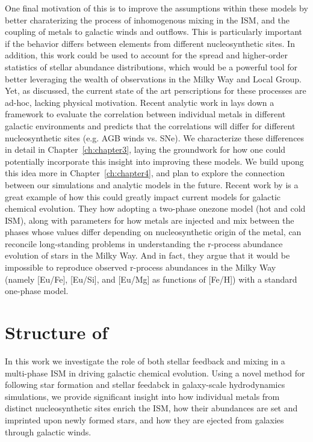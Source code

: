 One final motivation of this \dissertation is to improve the assumptions within these models by better charaterizing the process of inhomogenous mixing in the ISM, and the coupling of metals to galactic winds and outflows. This is particularly important if the behavior differs between elements from different nucleosynthetic sites. In addition, this work could be used to account for the spread and higher-order statistics of stellar abundance distributions, which would be a powerful tool for better leveraging the wealth of observations in the Milky Way and Local Group. Yet, as discussed, the current state of the art perscriptions for these processes are ad-hoc, lacking physical motivation. Recent analytic work in \cite{KrumholzTing2018} lays down a framework to evaluate the correlation between individual metals in different galactic environments and predicts that the correlations will differ for different nucleosynthetic sites (e.g. AGB winds vs. SNe). We characterize these differences in detail in Chapter~\ref{ch:chapter3}, laying the groundwork for how one could potentially incorporate this insight into improving these models. We build upong this idea more in Chapter~\ref{ch:chapter4}, and plan to explore the connection between our simulations and analytic models in the future. Recent work by \cite{SchonrichWeinberg2019} is a great example of how this could greatly impact current models for galactic chemical evolution. They how adopting a two-phase onezone model (hot and cold ISM), along with parameters for how metals are injected and mix between the phases whose values differ depending on nucleosynthetic origin of the metal, can reconcile long-standing problems in understanding the r-process abundance evolution of stars in the Milky Way. And in fact, they argue that it would be impossible to reproduce observed r-process abundances in the Milky Way (namely [Eu/Fe], [Eu/Si], and [Eu/Mg] as functions of [Fe/H]) with a standard one-phase model.


\section{Structure of \dissertation}\label{intro:sec:structure}
\label{intro:sec:structure}

In this work we investigate the role of both stellar feedback and mixing in a multi-phase ISM in driving galactic chemical evolution. Using a novel method for following star formation and stellar feedabck in galaxy-scale hydrodynamics simulations, we provide significant insight into how individual metals from distinct nucleosynthetic sites enrich the ISM, how their abundances are set and imprinted upon newly formed stars, and how they are ejected from galaxies through galactic winds.

